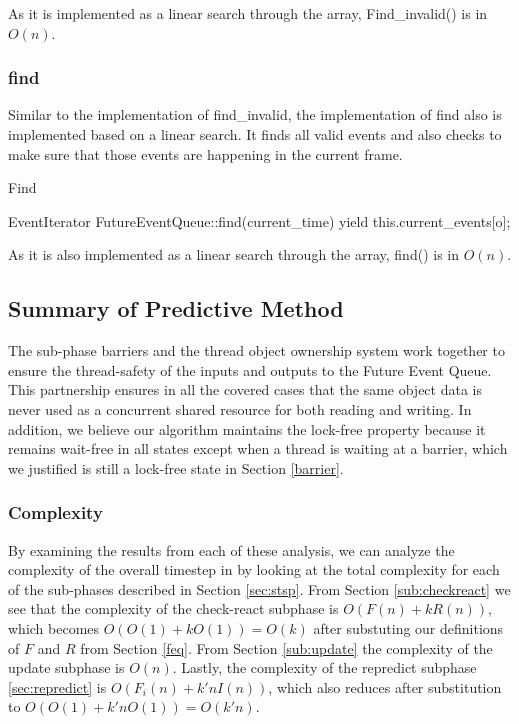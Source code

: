 \documentclass[conference]{IEEEtran}
\begin{document}
As it is implemented as a linear search through the array, Find\_invalid() is in $O(n)$.  


\subsubsection{find}

Similar to the implementation of find\_invalid, the implementation of find also is implemented based on a linear search.  It finds all valid events
and also checks to make sure that those events are happening in the current frame.

\begin{algorithm}
\caption{Find}
\begin{algorithmic}
\STATE EventIterator FutureEventQueue::find(current\_time)
		\STATE {}
		\STATE yield this.current\_events[o];
	\ENDIF
\ENDFOR
\end{algorithmic}
\end{algorithm}

As it is also implemented as a linear search through the array, find() is in $O(n)$.

\subsection{Summary of Predictive Method}
	The sub-phase barriers and the thread object ownership system work together to ensure the thread-safety of the inputs and outputs to the Future Event Queue.
This partnership ensures in all the covered cases that the same object data is never used as a concurrent shared resource for both reading and writing.  In addition, we believe our algorithm maintains
the lock-free property because it remains wait-free in all states except when a thread is waiting at a barrier, which we justified is still a lock-free state in Section \ref{barrier}.

\subsubsection{Complexity}

By examining the results from each of these analysis, we can analyze the complexity of the overall timestep in by looking at the total complexity for each of the sub-phases described in Section \ref{sec:stsp}.
From Section \ref{sub:checkreact} we see that the complexity of the check-react subphase is $O(F(n)+k R(n))$, which becomes $O(O(1)+kO(1))=O(k)$ after substuting our definitions of $F$ and $R$ from Section \ref{feq}.
From Section \ref{sub:update} the complexity of the update subphase is $O(n)$.  
Lastly, the complexity of the repredict subphase \ref{sec:repredict} is $O(F_i(n)+k' n I(n))$, which also reduces after substitution to $O(O(1)+k' n O(1))=O(k'n)$.
\end{document}
